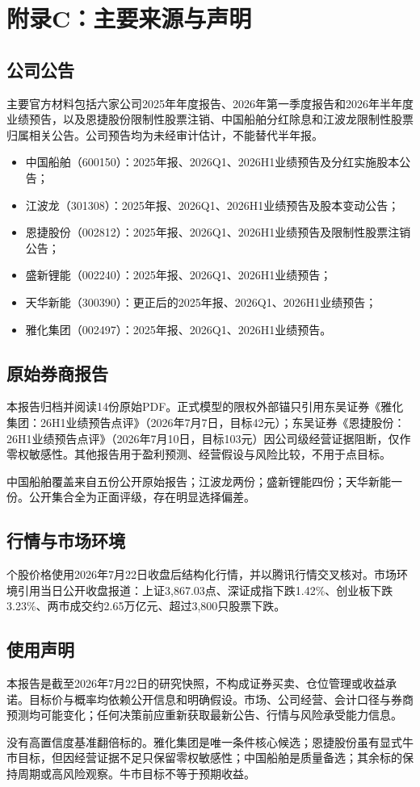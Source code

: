 \chapter{附录C：主要来源与声明}

\section{公司公告}

主要官方材料包括六家公司2025年年度报告、2026年第一季度报告和2026年半年度业绩预告，以及恩捷股份限制性股票注销、中国船舶分红除息和江波龙限制性股票归属相关公告。公司预告均为未经审计估计，不能替代半年报。

\begin{itemize}
  \item 中国船舶（600150）：2025年报、2026Q1、2026H1业绩预告及分红实施股本公告；
  \item 江波龙（301308）：2025年报、2026Q1、2026H1业绩预告及股本变动公告；
  \item 恩捷股份（002812）：2025年报、2026Q1、2026H1业绩预告及限制性股票注销公告；
  \item 盛新锂能（002240）：2025年报、2026Q1、2026H1业绩预告；
  \item 天华新能（300390）：更正后的2025年报、2026Q1、2026H1业绩预告；
  \item 雅化集团（002497）：2025年报、2026Q1、2026H1业绩预告。
\end{itemize}

\section{原始券商报告}

本报告归档并阅读14份原始PDF。正式模型的限权外部锚只引用东吴证券《雅化集团：26H1业绩预告点评》（2026年7月7日，目标42元）；东吴证券《恩捷股份：26H1业绩预告点评》（2026年7月10日，目标103元）因公司级经营证据阻断，仅作零权敏感性。其他报告用于盈利预测、经营假设与风险比较，不用于点目标。

中国船舶覆盖来自五份公开原始报告；江波龙两份；盛新锂能四份；天华新能一份。公开集合全为正面评级，存在明显选择偏差。

\section{行情与市场环境}

个股价格使用2026年7月22日收盘后结构化行情，并以腾讯行情交叉核对。市场环境引用当日公开收盘报道：上证3,867.03点、深证成指下跌1.42\%、创业板下跌3.23\%、两市成交约2.65万亿元、超过3,800只股票下跌。

\section{使用声明}

本报告是截至2026年7月22日的研究快照，不构成证券买卖、仓位管理或收益承诺。目标价与概率均依赖公开信息和明确假设。市场、公司经营、会计口径与券商预测均可能变化；任何决策前应重新获取最新公告、行情与风险承受能力信息。

\begin{disclosurebox}[最终结论复述]
没有高置信度基准翻倍标的。雅化集团是唯一条件核心候选；恩捷股份虽有显式牛市目标，但因经营证据不足只保留零权敏感性；中国船舶是质量备选；其余标的保持周期或高风险观察。牛市目标不等于预期收益。
\end{disclosurebox}
